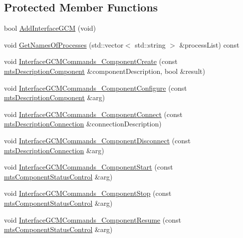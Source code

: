 \subsection*{Protected Member Functions}
\begin{DoxyCompactItemize}
\item 
bool \hyperlink{classmts_manager_component_server_a3384159cec50ef6169f8c8b38dcee9bd}{Add\-Interface\-G\-C\-M} (void)
\item 
void \hyperlink{classmts_manager_component_server_a12a96063cacc87c1d9d808fefbae6ac0}{Get\-Names\-Of\-Processes} (std\-::vector$<$ std\-::string $>$ \&process\-List) const 
\item 
void \hyperlink{classmts_manager_component_server_aaed93e634c3edb8108f6211bd409a05b}{Interface\-G\-C\-M\-Commands\-\_\-\-Component\-Create} (const \hyperlink{classmts_description_component}{mts\-Description\-Component} \&component\-Description, bool \&result)
\item 
void \hyperlink{classmts_manager_component_server_ac1a005492dde62b258eadcdc5ec20232}{Interface\-G\-C\-M\-Commands\-\_\-\-Component\-Configure} (const \hyperlink{classmts_description_component}{mts\-Description\-Component} \&arg)
\item 
void \hyperlink{classmts_manager_component_server_ae635792d3cd3fb4d84167e4ee149c664}{Interface\-G\-C\-M\-Commands\-\_\-\-Component\-Connect} (const \hyperlink{classmts_description_connection}{mts\-Description\-Connection} \&connection\-Description)
\item 
void \hyperlink{classmts_manager_component_server_a734eefb7e18ba05156a9ca1443a77b39}{Interface\-G\-C\-M\-Commands\-\_\-\-Component\-Disconnect} (const \hyperlink{classmts_description_connection}{mts\-Description\-Connection} \&arg)
\item 
void \hyperlink{classmts_manager_component_server_afe4917628e2e91dfe20fffafc43fe746}{Interface\-G\-C\-M\-Commands\-\_\-\-Component\-Start} (const \hyperlink{classmts_component_status_control}{mts\-Component\-Status\-Control} \&arg)
\item 
void \hyperlink{classmts_manager_component_server_af2f4fc96e195cc1a7d5811a3fdb8e379}{Interface\-G\-C\-M\-Commands\-\_\-\-Component\-Stop} (const \hyperlink{classmts_component_status_control}{mts\-Component\-Status\-Control} \&arg)
\item 
void \hyperlink{classmts_manager_component_server_a9029510ae1992a36feb9388dbceb098b}{Interface\-G\-C\-M\-Commands\-\_\-\-Component\-Resume} (const \hyperlink{classmts_component_status_control}{mts\-Component\-Status\-Control} \&arg)

\end{DoxyCompactItemize}
